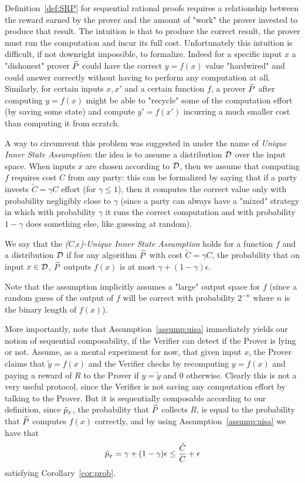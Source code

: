 Definition~\ref{def:SRP} for sequential rational proofs requires a relationship between the reward earned by the prover and the amount of "work" the prover invested to produce that result. The intuition is that to produce the correct result, the prover must run the computation and incur its full cost. Unfortunately 
this intuition is difficult, if not downright impossible, to formalize. Indeed for a specific input $x$ a "dishonest" prover $\widetilde{P}$ could have the correct 
$y=f(x)$ value "hardwired" and could answer correctly without having to perform any computation at all. Similarly, for certain inputs $x,x'$ and a certain 
function $f$, a prover $\widetilde{P}$ after computing $y=f(x)$ might be able to "recycle" some of the computation effort (by saving some state) and compute 
$y'=f(x')$ incurring a much smaller cost than computing it from scratch. 

A way to circumvent this problem was suggested in \cite{b08} under the name of {\em Unique Inner State Assumption}: the idea is to assume a distribution 
$\cal D$ over the input space. When inputs $x$ are chosen according to $\cal D$, then we assume that computing $f$ requires cost $C$ from any party: 
this can be formalized by saying that if a party invests $\tilde{C}=\gamma C$ effort (for $\gamma \leq 1$), then it computes the correct value only with
probability negligibly close to $\gamma$ (since 
a party can always have a "mixed" strategy in which with probability $\gamma$ it runs the correct computation and with probability $1-\gamma$ does 
something else, like guessing at random). 

\begin{assumption}
\label{assump:uisa}
We say that the {\em ($C$,$\epsilon$)-Unique Inner State Assumption} holds for a function $f$ and a distribution $\cal D$ if for any algorithm $\widetilde{P}$ with
cost $\tilde{C}=\gamma C$, the probability that on input $x \in {\cal D}$, $\widetilde{P}$ outputs $f(x)$ is at most $\gamma+(1-\gamma)\epsilon$. 
\end{assumption}

Note that the assumption implicitly assumes a "large" output space for $f$ (since a random guess of the output of $f$ will be correct with probability 
$2^{-n}$ where $n$ is the binary length of $f(x)$). 

More importantly, note that Assumption~\ref{assump:uisa} immediately yields our notion of sequential composability, if the Verifier can detect if the 
Prover is lying or not. Assume, as a mental experiment for now, that given input $x$, the Prover claims that $\tilde{y}=f(x)$ and the Verifier
checks by recomputing $y=f(x)$ and paying a reward of $R$ to the Prover if $y=\tilde{y}$ and $0$ otherwise. Clearly this is not a very useful protocol, 
since the Verifier is not saving any computation effort by talking to the Prover. But it is sequentially composable according to our definition, since 
$\tilde{p}_x$, the probability that $\widetilde{P}$ collects $R$, is equal to the probability that $\widetilde{P}$ computes $f(x)$ correctly, and by using 
Assumption~\ref{assump:uisa} we have that 
$$ \tilde{p}_x = \gamma+(1-\gamma)\epsilon \leq \frac{\tilde{C}}{C} + \epsilon $$
satisfying Corollary~\ref{cor:prob}.

